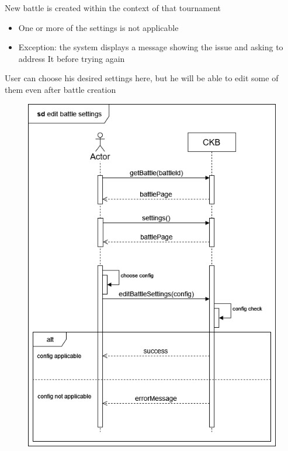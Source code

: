 {New battle is created within the context of that tournament} %
{ %
    \begin{itemize}
        \item One or more of the settings is not applicable
    \end{itemize}
}
{ %
    \begin{itemize}
        \item Exception: the system displays a message showing the issue and asking to address It before trying again
    \end{itemize} 
    User can choose his desired settings here, but he will be able to edit some of them even after battle creation
}

\usecase
{
    \begin{figure}[H]
        \centering
        \includegraphics[width=\textwidth]{src/sd_diagrams/managebattsetts.png}
    \end{figure}
}
